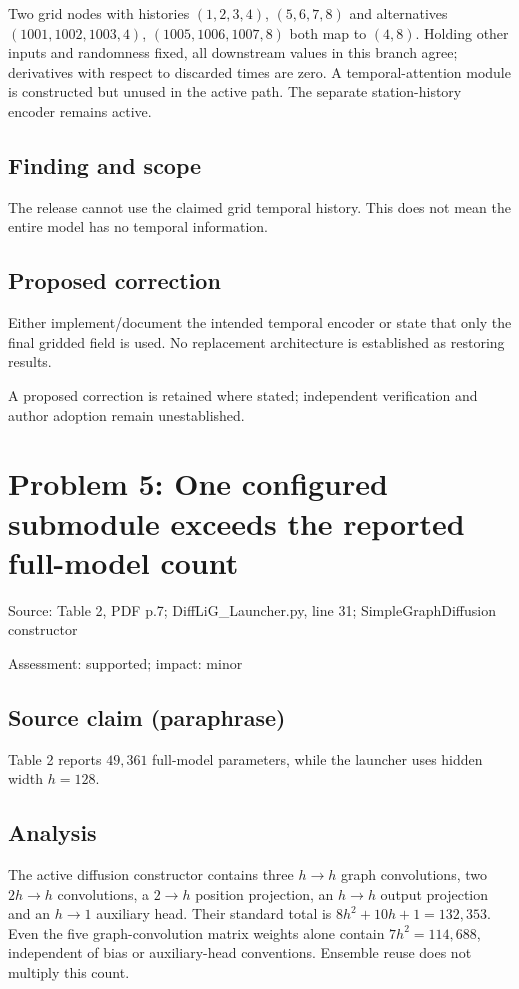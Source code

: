 \documentclass[11pt]{article}
\begin{document}
Two grid nodes with histories \((1,2,3,4)\), \((5,6,7,8)\) and alternatives \((1001,1002,1003,4)\), \((1005,1006,1007,8)\) both map to \((4,8)\). Holding other inputs and randomness fixed, all downstream values in this branch agree; derivatives with respect to discarded times are zero. A temporal-attention module is constructed but unused in the active path. The separate station-history encoder remains active.

\subsection*{Finding and scope}

The release cannot use the claimed grid temporal history. This does not mean the entire model has no temporal information.

\subsection*{Proposed correction}

Either implement/document the intended temporal encoder or state that only the final gridded field is used. No replacement architecture is established as restoring results.

A proposed correction is retained where stated; independent verification and author adoption remain unestablished.

\section*{Problem 5: One configured submodule exceeds the reported full-model count}

Source: Table 2, PDF p.7; DiffLiG\_Launcher.py, line 31; SimpleGraphDiffusion constructor

Assessment: supported; impact: minor

\subsection*{Source claim (paraphrase)}

Table 2 reports \(49{,}361\) full-model parameters, while the launcher uses hidden width \(h=128\).

\subsection*{Analysis}

The active diffusion constructor contains three \(h\to h\) graph convolutions, two \(2h\to h\) convolutions, a \(2\to h\) position projection, an \(h\to h\) output projection and an \(h\to1\) auxiliary head. Their standard total is \(8h^2+10h+1=132{,}353\). Even the five graph-convolution matrix weights alone contain \(7h^2=114{,}688\), independent of bias or auxiliary-head conventions. Ensemble reuse does not multiply this count.
\end{document}
